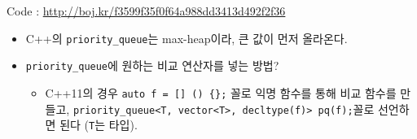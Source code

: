 \documentclass[hyperref={unicode}]{beamer}
\begin{document}
    \begin{frame}[fragile]
        Code : \url{http://boj.kr/f3599f35f0f64a988dd3413d492f2f36}
        \begin{itemize}
            \item C++의 \verb|priority_queue|는 max-heap이라, 큰 값이 먼저 올라온다.
            \item \verb|priority_queue|에 원하는 비교 연산자를 넣는 방법?
            \begin{itemize}
            \item C++11의 경우 \verb|auto f = [] () {};| 꼴로 익명 함수를 통해 비교 함수를 만들고, \verb|priority_queue<T, vector<T>, decltype(f)> pq(f);|꼴로 선언하면 된다 (\verb|T|는 타입).
            \end{itemize}
        \end{itemize}
    \end{frame}
\end{document}
